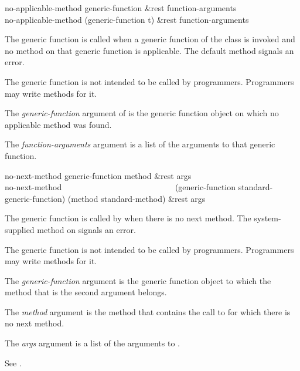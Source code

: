 \begin{defun}
no-applicable-method generic-function &rest function-arguments \\
no-applicable-method (generic-function t) &rest function-arguments

The generic function  is called when a
generic function of the class  is invoked
and no method on that generic function is applicable.
The default method signals an error.

The generic function  is not intended to be called
by programmers.  Programmers may write methods for it.





The {\it generic-function\/} argument of  is the
generic function object on which no applicable method was found.  

The {\it function-arguments} argument is a list of the arguments to that
generic function.

\end{defun}

\begin{defun}
no-next-method generic-function method &rest args \\
no-next-method~~~~~~~~~~~~~~~~~~~~~~~~~~~ (generic-function standard-generic-function)
    (method standard-method) &rest args

The generic function  is called by 
 when there is no next method.  The system-supplied
method on  signals an error.

The generic function  is not intended to be called
by programmers.  Programmers may write methods for it.





The {\it generic-function\/} argument is the generic function object
to which the method that is the second argument belongs.

The {\it method\/} argument is the method that contains the call to
 for which there is no next method.

The {\it args\/} argument is a list of the arguments to
.

See .

\end{defun}


